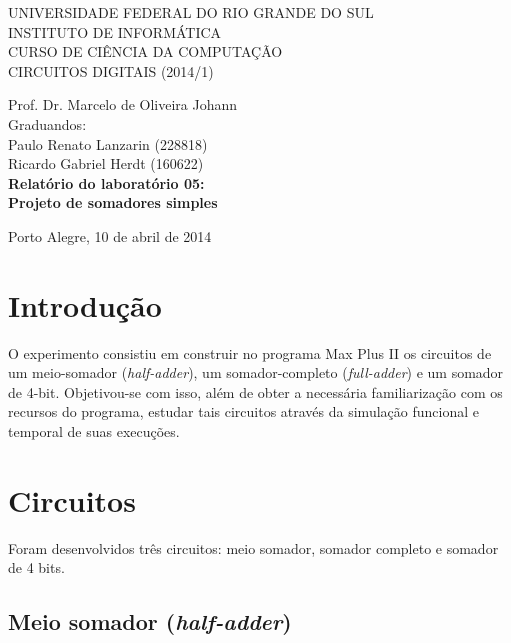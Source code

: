 \documentclass[a4paper]{article}
\begin{document}
\begin{titlepage}
\begin{center}


\large{ 
\uppercase{ Universidade Federal do Rio Grande do Sul\\

Instituto de Informática \\

Curso de Ciência da Computação \\

Circuitos Digitais (2014/1)\\
}

Prof. Dr. Marcelo de Oliveira Johann \\

Graduandos: \\ Paulo Renato Lanzarin (228818)
			\\ Ricardo Gabriel Herdt (160622) \\ [4.5cm]


\LARGE {\bfseries Relatório do laboratório 05: \\
	Projeto de somadores simples\\[1.0cm]
}}


\vfill

Porto Alegre, 10 de abril de 2014

\end{center}
\end{titlepage}
\section{Introdução}

	O experimento consistiu em construir no programa Max Plus II os
circuitos de um meio-somador (\emph{half-adder}), um somador-completo
(\emph{full-adder}) e um somador de 4-bit.  Objetivou-se com isso, além de
obter a necessária familiarização com os recursos do programa, estudar tais
circuitos através da simulação funcional e temporal de suas execuções.


\section{Circuitos}

Foram desenvolvidos três circuitos: meio somador, somador completo e somador de
4 bits.

\subsection{Meio somador (\emph{half-adder})}
\end{document}
